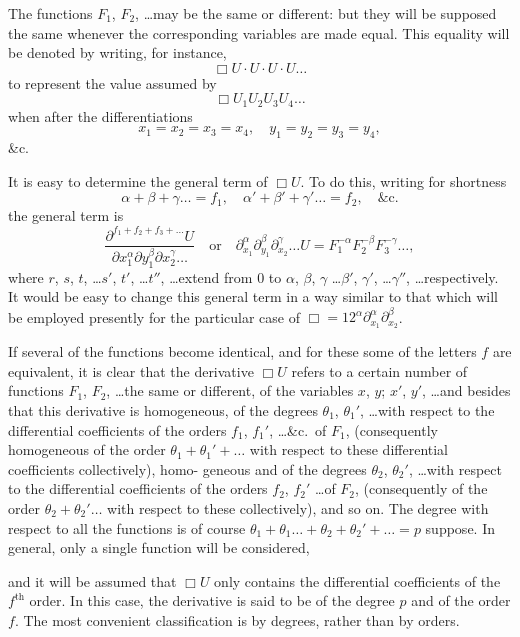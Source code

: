 \documentclass[11pt,a4paper]{book}
\begin{document}
\newpage
The functions $F_1$, $F_2$, \ldots may be the same or different: but they will be supposed the
same whenever the corresponding variables are made equal. This equality will be
denoted by writing, for instance,
\[
\Box U \cdot U \cdot U \cdot U \ldots
\]
to represent the value assumed by
\[
\Box U_1 U_2 U_3 U_4 \ldots
\]
when after the differentiations
\[
x_1 = x_2 = x_3 = x_4, \quad y_1 = y_2 = y_3 = y_4,
\]
\&c.

It is easy to determine the general term of $\Box U$. To do this, writing for shortness
\[
\alpha + \beta + \gamma \ldots = f_1, \quad
\alpha' + \beta' + \gamma' \ldots = f_2, \quad
\&\text{c.}
\]
the general term is
\[
\frac{\partial^{f_1 + f_2 + f_3 + \ldots} U}{\partial x_1^{\alpha} \partial y_1^{\beta} \partial x_2^{\gamma} \ldots}
\quad \text{or} \quad
\partial_{x_1}^{\alpha} \partial_{y_1}^{\beta} \partial_{x_2}^{\gamma} \ldots U
= F_1^{-\alpha} F_2^{-\beta} F_3^{-\gamma} \ldots,
\]
where $r$, $s$, $t$, \ldots $s'$, $t'$, \ldots $t''$, \ldots extend from $0$ to $\alpha$, $\beta$, $\gamma$ \ldots $\beta'$, $\gamma'$, \ldots $\gamma''$, \ldots respectively. It
would be easy to change this general term in a way similar to that which will be
employed presently for the particular case of $\Box = 12^{\alpha} \partial_{x_1}^{\alpha} \partial_{x_2}^{\beta}$.

If several of the functions become identical, and for these some of the letters
$f$ are equivalent, it is clear that the derivative $\Box U$ refers to a certain number of
functions $F_1$, $F_2$, \ldots the same or different, of the variables $x$, $y$; $x'$, $y'$, \ldots and besides
that this derivative is homogeneous, of the degrees $\theta_1$, $\theta_1'$, \ldots with respect to the
differential coefficients of the orders $f_1$, $f_1'$, \ldots \&c.\ of $F_1$, (consequently homogeneous of
the order $\theta_1 + \theta_1' + \ldots$ with respect to these differential coefficients collectively), homo-
geneous and of the degrees $\theta_2$, $\theta_2'$, \ldots with respect to the differential coefficients of
the orders $f_2$, $f_2'$ \ldots of $F_2$, (consequently of the order $\theta_2 + \theta_2' \ldots$ with respect to these
collectively), and so on. The degree with respect to all the functions is of course
$\theta_1 + \theta_1 \ldots + \theta_2 + \theta_2' + \ldots = p$ suppose. In general, only a single function will be considered,

\newpage
and it will be assumed that $\Box U$ only contains the differential coefficients of the
$f^{\text{th}}$ order. In this case, the derivative is said to be of the degree $p$ and of the
order $f$. The most convenient classification is by degrees, rather than by orders.
\end{document}
